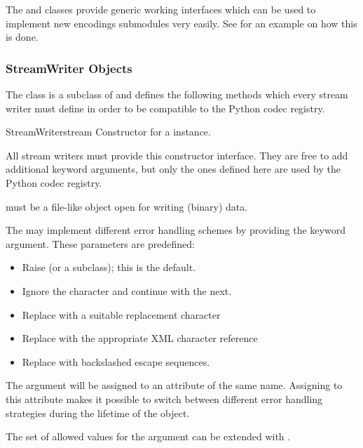 The  and  classes provide
generic working interfaces which can be used to implement new
encodings submodules very easily. See  for an
example on how this is done.


\subsubsection{StreamWriter Objects \label{stream-writer-objects}}

The  class is a subclass of  and
defines the following methods which every stream writer must define in
order to be compatible to the Python codec registry.

\begin{classdesc}{StreamWriter}{stream}
  Constructor for a  instance. 

  All stream writers must provide this constructor interface. They are
  free to add additional keyword arguments, but only the ones defined
  here are used by the Python codec registry.

   must be a file-like object open for writing (binary)
  data.

  The  may implement different error handling
  schemes by providing the  keyword argument. These
  parameters are predefined:

  \begin{itemize}
    \item {} Raise  (or a subclass);
                          this is the default.
    \item {} Ignore the character and continue with the next.
    \item {} Replace with a suitable replacement character
    \item {} Replace with the appropriate XML
                     character reference
    \item {} Replace with backslashed escape sequences.
  \end{itemize}

  The  argument will be assigned to an attribute of the
  same name. Assigning to this attribute makes it possible to switch
  between different error handling strategies during the lifetime
  of the  object.

  The set of allowed values for the  argument can
  be extended with .
\end{classdesc}

